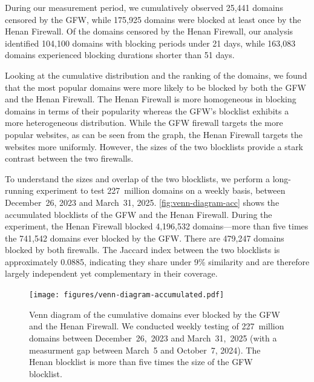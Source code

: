 \documentclass[conference,compsoc]{IEEEtran}
\begin{document}
During our measurement period, we cumulatively observed 25,441 domains censored by the GFW,
while 175,925 domains were blocked at least once by the Henan Firewall.
Of the domains censored by the Henan Firewall, our analysis identified 104,100 domains
with blocking periods under 21 days, while 163,083 domains experienced blocking durations shorter than 51 days.

Looking at the cumulative distribution and the ranking of the domains,
we found that the most popular domains were more likely to be blocked by both the GFW and the Henan Firewall.
The Henan Firewall is more homogeneous in blocking domains in terms of their popularity whereas the GFW's blocklist exhibits a more heterogeneous distribution.
While the GFW firewall targets the more popular websites,
as can be seen from the graph,
the Henan Firewall targets the websites more uniformly.
However, the sizes of the two blocklists provide a stark contrast between the two firewalls.

To understand the sizes and overlap of the two blocklists,
we perform a long-running experiment to test 227~million domains on a weekly basis,
between December~26, 2023 and March~31, 2025.
\autoref{fig:venn-diagram-acc}
shows the accumulated blocklists of the GFW and the Henan Firewall.
During the experiment,
the Henan Firewall blocked 4,196,532 domains---more than five times the 741,542 domains ever blocked by the GFW.
There are 479,247 domains blocked by both firewalls.
The Jaccard index between the two blocklists is approximately 0.0885,
indicating they share under 9\% similarity and are therefore largely independent yet complementary in their coverage.


\begin{figure}[t]
  \texttt{[image: figures/venn-diagram-accumulated.pdf]}
  \caption{
    Venn diagram of the cumulative domains ever blocked by the GFW and the Henan Firewall.
    We conducted weekly testing of 227~million domains
    between
    December~26,~2023
    and
    March~31,~2025 (with a measurment gap between March~5 and October~7, 2024).
    The Henan blocklist is more than five times the size of the GFW blocklist.
    }
    \label{fig:venn-diagram-acc}
\end{figure}
\end{document}
